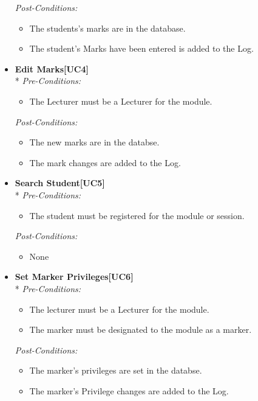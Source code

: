 \documentclass[a4paper]{article}
\begin{document}
\begin{itemize}
						\textit{Post-Conditions:}
								\begin{itemize}
									\item The students's marks are in the database.
									\item The student's Marks have been entered is added to the Log.
								\end{itemize}
														
				\item	\textbf{Edit Marks[UC4]}\\*
						\textit{Pre-Conditions:}
								\begin{itemize}
									\item The Lecturer must be a Lecturer for the module.
								\end{itemize}
								
						\textit{Post-Conditions:}
								\begin{itemize}
									\item The new marks are in the databse.
									\item The mark changes are added to the Log.
								\end{itemize}
														
				\item	\textbf{Search Student[UC5]}\\*
						\textit{Pre-Conditions:}
								\begin{itemize}
									\item The student must be registered for the module or session.
								\end{itemize}
								
						\textit{Post-Conditions:}
								\begin{itemize}
									\item None
								\end{itemize}
														
				\item	\textbf{Set Marker Privileges[UC6]}\\*
						\textit{Pre-Conditions:}
								\begin{itemize}
									\item The lecturer must be a Lecturer for the module.
									\item The marker must be designated to the module as a marker.
								\end{itemize}
								
						\textit{Post-Conditions:}
								\begin{itemize}
									\item The marker's privileges are set in the databse.
									\item The marker's Privilege changes are added to the Log.
								\end{itemize}
														

\end{itemize}
\end{document}
